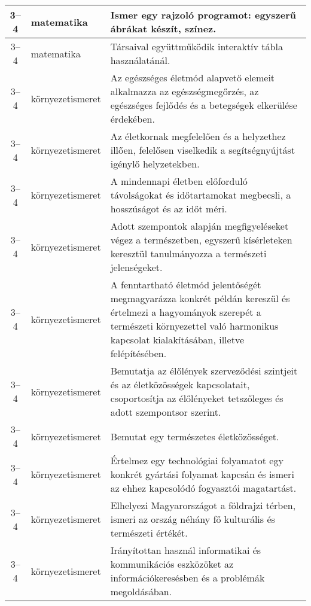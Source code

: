 \begin{small}
\begin{longtable}{c | p{2cm} |  p{11cm} }
              3--4 & matematika & Ismer egy rajzoló programot: egyszerű ábrákat készít, színez.
 \\ \hline
              3--4 & matematika & Társaival együttműködik interaktív tábla használatánál. \\ \hline
              3--4 & környezetismeret & Az egészséges életmód alapvető elemeit alkalmazza az egészségmegőrzés, az egészséges fejlődés és a betegségek elkerülése érdekében. \\ \hline
              3--4 & környezetismeret & Az életkornak megfelelően és a helyzethez illően, felelősen viselkedik a segítségnyújtást igénylő helyzetekben. \\ \hline
              3--4 & környezetismeret & A mindennapi életben előforduló távolságokat és időtartamokat megbecsli, a hosszúságot és az időt méri. \\ \hline
              3--4 & környezetismeret & Adott szempontok alapján megfigyeléseket végez a természetben, egyszerű kísérleteken keresztül tanulmányozza a természeti jelenségeket. \\ \hline
              3--4 & környezetismeret & A fenntartható életmód jelentőségét megmagyarázza konkrét példán kereszül és értelmezi a hagyományok szerepét a természeti környezettel való harmonikus kapcsolat kialakításában, illetve felépítésében. \\ \hline
              3--4 & környezetismeret & Bemutatja az élőlények szerveződési szintjeit és az életközösségek kapcsolatait, csoportosítja az élőlényeket tetszőleges és adott szempontsor szerint. \\ \hline
              3--4 & környezetismeret & Bemutat egy természetes életközösséget. \\ \hline
              3--4 & környezetismeret & Értelmez egy technológiai folyamatot egy konkrét gyártási folyamat kapcsán és ismeri az ehhez kapcsolódó fogyasztói magatartást. \\ \hline
              3--4 & környezetismeret & Elhelyezi Magyarországot a földrajzi térben, ismeri az ország néhány fő kulturális és természeti értékét. \\ \hline
              3--4 & környezetismeret & Irányítottan használ informatikai és kommunikációs eszközöket az információkeresésben és a problémák megoldásában. \\ \hline
      \end{longtable}
\end{small}


